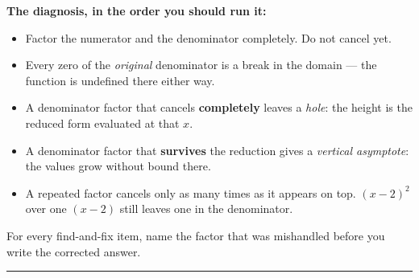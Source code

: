 \documentclass[12pt]{article}
\begin{document}

\noindent\textbf{The diagnosis, in the order you should run it:}
\begin{itemize}[leftmargin=0.9cm, itemsep=1pt, topsep=2pt]
  \item Factor the numerator and the denominator completely. Do not cancel yet.
  \item Every zero of the \emph{original} denominator is a break in the domain --- the function is undefined there either way.
  \item A denominator factor that cancels \textbf{completely} leaves a \emph{hole}: the height is the reduced form evaluated at that $x$.
  \item A denominator factor that \textbf{survives} the reduction gives a \emph{vertical asymptote}: the values grow without bound there.
  \item A repeated factor cancels only as many times as it appears on top. $(x-2)^2$ over one $(x-2)$ still leaves one in the denominator.
\end{itemize}

\noindent For every find-and-fix item, name the factor that was mishandled
before you write the corrected answer.

\vspace{0.15cm}
\noindent\rule{\linewidth}{0.4pt}




\end{document}
